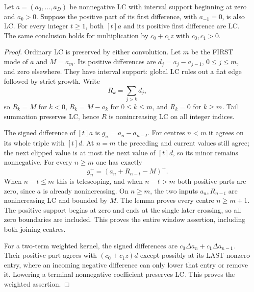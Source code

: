 \begin{theorem}
Let $a=(a_0,\ldots,a_D)$ be nonnegative LC with interval support
beginning at zero and $a_0>0$. Suppose the positive part of its
first difference, with $a_{-1}=0$, is also LC. For every integer
$t\ge1$, both $[t]a$ and its positive first difference are LC.
The same conclusion holds for multiplication by $c_0+c_1z$ with
$c_0,c_1>0$.
\end{theorem}
\begin{proof}
Ordinary LC is preserved by either convolution. Let $m$ be the
FIRST mode of $a$ and $M=a_m$. Its positive differences are
$d_j=a_j-a_{j-1}$, $0\le j\le m$, and zero elsewhere. They have
interval support: global LC rules out a flat edge followed by
strict growth. Write
\[
 R_k=\sum_{j>k}d_j,
\]
so $R_k=M$ for $k<0$, $R_k=M-a_k$ for $0\le k\le m$, and
$R_k=0$ for $k\ge m$. Tail summation preserves LC, hence $R$ is
nonincreasing LC on all integer indices.

The signed difference of $[t]a$ is $g_n=a_n-a_{n-t}$.
For centres $n<m$ it agrees on its whole triple with $[t]d$.
At $n=m$ the preceding and current values still agree; the next
clipped value is at most the next value of $[t]d$, so its minor
remains nonnegative. For every $n\ge m$ one has exactly
\[
             g_n^+=(a_n+R_{n-t}-M)^+.
\]
When $n-t\le m$ this is telescoping, and when $n-t>m$ both
positive parts are zero, since $a$ is already nonincreasing.
On $n\ge m$, the two inputs $a_n,R_{n-t}$ are nonincreasing LC
and bounded by $M$. The lemma proves every centre $n\ge m+1$.
The positive support begins at zero and ends at the single later
crossing, so all zero boundaries are included. This proves the
entire window assertion, including both joining centres.

For a two-term weighted kernel, the signed differences are
$c_0\Delta a_n+c_1\Delta a_{n-1}$. Their positive part agrees
with $(c_0+c_1z)d$ except possibly at its LAST nonzero entry,
where an incoming negative difference can only lower that entry
or remove it. Lowering a terminal nonnegative coefficient preserves
LC. This proves the weighted assertion.
\end{proof}

